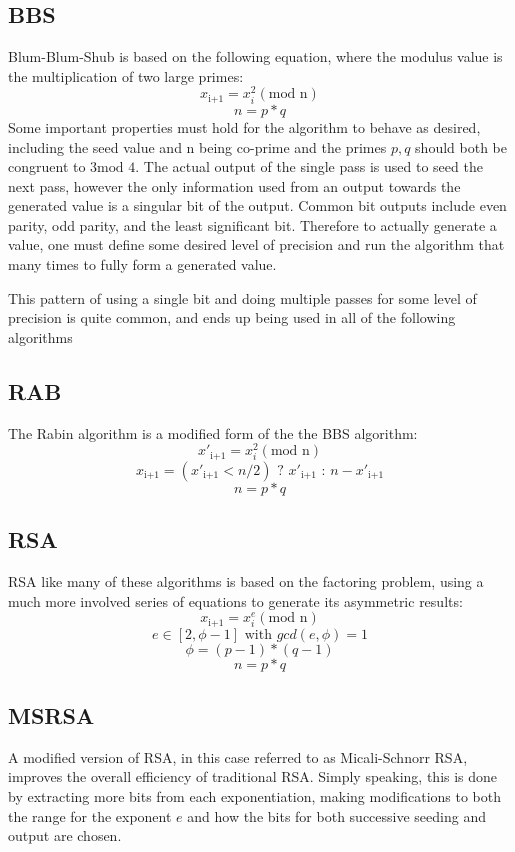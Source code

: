 \documentclass[12pt,letter,notitlepage]{article}
\begin{document}
\subsection{BBS}

Blum-Blum-Shub is based on the following equation, where the modulus value is the multiplication of two large primes:
\[x_{\text{i+1}} = x_i^2 ({\text{mod n}})\]
\[n = p*q\]
Some important properties must hold for the algorithm to behave as desired, including the seed value and n being co-prime and the primes $p, q$ should both be congruent to $3{\text{mod 4}}$. The actual output of the single pass is used to seed the next pass, however the only information used from an output towards the generated value is a singular bit of the output. Common bit outputs include even parity, odd parity, and the least significant bit. Therefore to actually generate a value, one must define some desired level of precision and run the algorithm that many times to fully form a generated value. 

This pattern of using a single bit and doing multiple passes for some level of precision is quite common, and ends up being used in all of the following algorithms

\subsection{RAB}

The Rabin algorithm is a modified form of the the BBS algorithm:
\[x'_{\text{i+1}} = x_i^2 ({\text{mod n}})\]
\[x_{\text{i+1}} = (x'_{\text{i+1}} < n/2) \text{ ? } x'_{\text{i+1}} \text{ : } n - x'_{\text{i+1}}\]
\[n = p*q\]

\subsection{RSA}

RSA like many of these algorithms is based on the factoring problem, using a much more involved series of equations to generate its asymmetric results:
\[x_{\text{i+1}} = x_i^e ({\text{mod n}})\]
\[e \in [2,\phi-1] {\text{ with }} gcd(e,\phi) = 1\]
\[\phi = (p-1)*(q-1)\]
\[n = p*q\]

\subsection{MSRSA}

A modified version of RSA, in this case referred to as Micali-Schnorr RSA, improves the overall efficiency of traditional RSA. Simply speaking, this is done by extracting more bits from each exponentiation, making modifications to both the range for the exponent $e$ and how the bits for both successive seeding and output are chosen.
\end{document}
